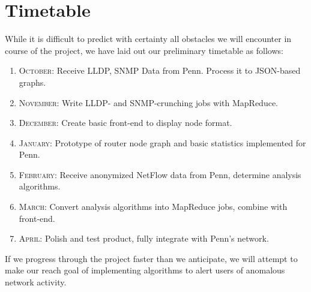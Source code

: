 \documentclass{sig-alternate}
\begin{document}
\section{Timetable}

While it is difficult to predict with certainty all obstacles we will encounter
in course of the project, we have laid out our preliminary timetable as follows:

\begin{enumerate}
    \item \textsc{October}: Receive LLDP, SNMP Data from Penn. Process it to
        JSON-based graphs.
    \item \textsc{November}: Write LLDP- and SNMP-crunching jobs with MapReduce.
    \item \textsc{December}: Create basic front-end to display node format.
    \item \textsc{January}: Prototype of router node graph and basic statistics
        implemented for Penn.
    \item \textsc{February}: Receive anonymized NetFlow data from Penn,
        determine analysis algorithms.
    \item \textsc{March}: Convert analysis algorithms into MapReduce jobs,
        combine with front-end.
    \item \textsc{April}: Polish and test product, fully integrate with Penn's
        network.
\end{enumerate}

If we progress through the project faster than we anticipate, we will attempt to
make our reach goal of implementing algorithms to alert users of anomalous
network activity.



\end{document}
